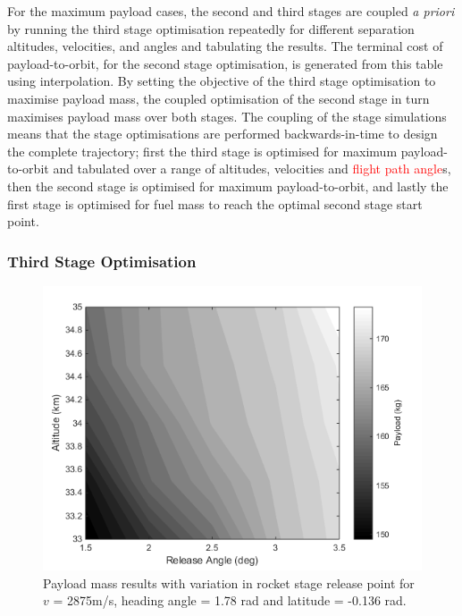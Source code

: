 \documentclass[journal]{new-aiaa}
\begin{document}
	 For the maximum payload cases, the second and third stages are coupled \textit{a priori} by running the third stage optimisation repeatedly for different separation altitudes, velocities, and angles and tabulating the results. The terminal cost of payload-to-orbit, for the second stage optimisation, is generated from this table using interpolation. By setting the objective of the third stage optimisation to maximise payload mass, the coupled optimisation of the second stage in turn maximises payload mass over both stages. 
	 The coupling of the stage simulations means that the stage optimisations are performed backwards-in-time to design the complete trajectory; first the third stage is optimised for maximum payload-to-orbit and tabulated over a range of altitudes, velocities and \textcolor{red}{flight path angle}s, then the second stage is optimised for maximum payload-to-orbit, and lastly the first stage is optimised for fuel mass to reach the optimal second stage start point. 
	 
	 
	 
	  \subsubsection{Third Stage Optimisation} \label{section:thirdstage}
	  
	   \begin{figure}[t]
	   	\begin{center}
	   		\includegraphics[width=0.6\linewidth]{contours}
	   		\caption{Payload mass results with variation in rocket stage release point for $v$ = 2875m/s, heading angle = 1.78 rad and latitude = -0.136 rad.}
	   		\label{fig:contours}
	   	\end{center}
	   \end{figure}
	   
\end{document}
